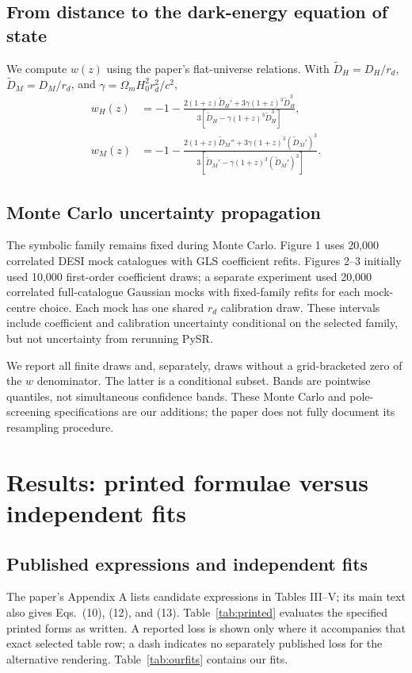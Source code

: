 \documentclass[11pt]{article}
\begin{document}
\subsection{From distance to the dark-energy equation of state}
We compute $w(z)$ using the paper's flat-universe relations. With $\widetilde D_H=D_H/r_d$, $\widetilde D_M=D_M/r_d$, and $\gamma=\Omega_mH_0^2r_d^2/c^2$,
\begin{align}
w_H(z)&=-1-\frac{2(1+z)\widetilde D_H'+3\gamma(1+z)^3\widetilde D_H^3}{3[\widetilde D_H-\gamma(1+z)^3\widetilde D_H^3]},\label{eq:wh}\\
w_M(z)&=-1-\frac{2(1+z)\widetilde D_M''+3\gamma(1+z)^3(\widetilde D_M')^3}{3[\widetilde D_M'-\gamma(1+z)^3(\widetilde D_M')^3]}.
\label{eq:wm}
\end{align}
\subsection{Monte Carlo uncertainty propagation}
The symbolic family remains fixed during Monte Carlo. Figure 1 uses 20,000 correlated DESI mock catalogues with GLS coefficient refits. Figures 2--3 initially used 10,000 first-order coefficient draws; a separate experiment used 20,000 correlated full-catalogue Gaussian mocks with fixed-family refits for each mock-centre choice. Each mock has one shared $r_d$ calibration draw. These intervals include coefficient and calibration uncertainty conditional on the selected family, but not uncertainty from rerunning PySR.

We report all finite draws and, separately, draws without a grid-bracketed zero of the $w$ denominator. The latter is a conditional subset. Bands are pointwise quantiles, not simultaneous confidence bands. These Monte Carlo and pole-screening specifications are our additions; the paper does not fully document its resampling procedure.

\section{Results: printed formulae versus independent fits}
\subsection{Published expressions and independent fits}
The paper's Appendix A lists candidate expressions in Tables III--V; its main text also gives Eqs.~(10), (12), and (13). Table~\ref{tab:printed} evaluates the specified printed forms as written. A reported loss is shown only where it accompanies that exact selected table row; a dash indicates no separately published loss for the alternative rendering. Table~\ref{tab:ourfits} contains our fits.
\end{document}
